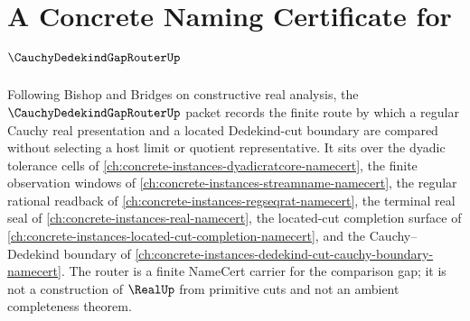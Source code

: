 \chapter{A Concrete Naming Certificate for $\CauchyDedekindGapRouterUp$}
\label{ch:concrete-instances-cauchy-dedekind-gap-router-namecert}

Following Bishop and Bridges on constructive real analysis, the $\CauchyDedekindGapRouterUp$ packet records the finite route by which a regular Cauchy real presentation and a located Dedekind-cut boundary are compared without selecting a host limit or quotient representative. It sits over the dyadic tolerance cells of \autoref{ch:concrete-instances-dyadicratcore-namecert}, the finite observation windows of \autoref{ch:concrete-instances-streamname-namecert}, the regular rational readback of \autoref{ch:concrete-instances-regseqrat-namecert}, the terminal real seal of \autoref{ch:concrete-instances-real-namecert}, the located-cut completion surface of \autoref{ch:concrete-instances-located-cut-completion-namecert}, and the Cauchy--Dedekind boundary of \autoref{ch:concrete-instances-dedekind-cut-cauchy-boundary-namecert}. The router is a finite NameCert carrier for the comparison gap; it is not a construction of $\RealUp$ from primitive cuts and not an ambient completeness theorem.

